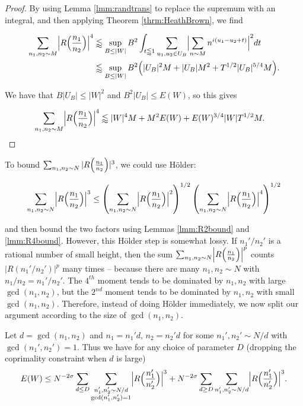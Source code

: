 \documentclass{amsart}
\theoremstyle{plain}
\numberwithin{equation}{section}
\begin{document}
\begin{proof}
By using Lemma  \ref{lmm:randtrans} to replace the supremum with an integral, and then applying Theorem \ref{thrm:HeathBrown},  we find

\begin{align*}
 \sum_{n_1,n_2\sim M}\Bigr|R\Bigl(\frac{n_1}{n_2}\Bigr)\Bigr|^4&\lessapprox \sup_{B\le |W|}B^2\int_{t\lessapprox 1}\sum_{u_1,u_2\in U_B} \Bigl|\sum_{n\sim M}n^{i(u_1-u_2+t)}\Bigr|^2dt\\
 &\lessapprox \sup_{B\le |W|}B^2\Bigl(|U_B|^2 M +  |U_B| M^2+ T^{1/2}|U_B|^{5/4} M\Bigr). 
 \end{align*}

We have that $B |U_B|\le |W|^2$ and $B^2 |U_B|\le E(W)$, so this gives

\begin{align*}
\sum_{n_1,n_2\sim M}\Bigr|R\Bigl(\frac{n_1}{n_2}\Bigr)\Bigr|^4&\lessapprox |W|^4 M + M^2 E(W) +  E(W)^{3/4}|W|T^{1/2}M.\qedhere
\end{align*}
\end{proof}

%
%


To bound $\sum_{n_1,n_2\sim N}|R\Bigl(\frac{n_1}{n_2}\Bigr)|^3$,  we could use H\"older:

\[ \sum_{n_1,n_2\sim N}\Bigl|R\Bigl(\frac{n_1}{n_2}\Bigr)\Bigr|^3 \le \left( \sum_{n_1,n_2\sim N}\Bigl|R\Bigl(\frac{n_1}{n_2}\Bigr)\Bigr|^2 \right)^{1/2} \left( \sum_{n_1,n_2\sim N}\Bigl|R\Bigl(\frac{n_1}{n_2}\Bigr)\Bigr|^4 \right)^{1/2}\]

\noindent and then bound the two factors using Lemmas \ref{lmm:R2bound} and \ref{lmm:R4bound}.   However, this H\"older step is somewhat lossy.   If $n_1'/n_2'$ is a rational number of small height,  then the sum $\sum_{n_1,n_2\sim N}\Bigl|R\Bigl(\frac{n_1}{n_2}\Bigr)\Bigr|^p$ counts $|R( n_1'/n_2')|^p$ many times -- because there are many $n_1,n_2 \sim N$ with $n_1/n_2 = n_1'/n_2'$.   The $4^{th}$ moment tends to be dominated by $n_1,n_2$ with large $\gcd(n_1,n_2)$, but the $2^{nd}$ moment tends to be dominated by $n_1, n_2$ with small $\gcd(n_1,n_2)$.   Therefore,  instead of doing H\"older immediately,  we now split our argument according to the size of $\gcd(n_1,n_2)$. 

Let $d=\gcd(n_1,n_2)$ and $n_1=n_1'd$, $n_2=n_2'd$ for some $n_1',n_2'\sim N/d$ with $\gcd(n_1',n_2')=1$. Thus we have for any choice of parameter $D$ (dropping the coprimality constraint when $d$ is large)
\begin{equation}
E(W)\le N^{-2\sigma}\sum_{d\le D}\sum_{\substack{n_1',n_2'\sim N/d\\ \gcd(n_1',n_2')=1}}\Bigl|R\Bigl(\frac{n_1'}{n_2'}\Bigr)\Bigr|^3+N^{-2\sigma}\sum_{d\ge D}\sum_{n_1',n_2'\sim N/d}\Bigl|R\Bigl(\frac{n_1'}{n_2'}\Bigr)\Bigr|^3.
\end{equation}
\end{document}
